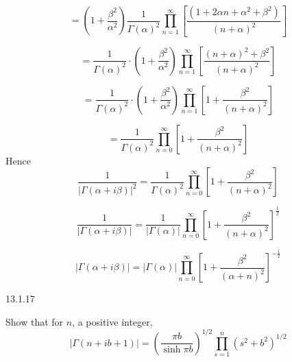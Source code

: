 \documentclass{article}
\begin{document}
\begin{flushleft}
$$
=\left(1+\frac{\beta^{2}}{\alpha^{2}}\right) \frac{1}{\Gamma(\alpha)^{2}} \prod_{n=1}^{\infty}\left[\frac{\left(1+2 \alpha n+\alpha^{2}+\beta^{2}\right)}{(n+\alpha)^{2}}\right]
$$

$$
=\frac{1}{\Gamma(\alpha)^{2}} \cdot\left(1+\frac{\beta^{2}}{\alpha^{2}}\right) \prod_{n=1}^{\infty}\left[\frac{(n+\alpha)^{2}+\beta^{2}}{(n+\alpha)^{2}}\right]
$$

$$
=\frac{1}{\Gamma(\alpha)^{2}} \cdot\left(1+\frac{\beta^{2}}{\alpha^{2}}\right) \prod_{n=1}^{\infty}\left[1+\frac{\beta^{2}}{(n+\alpha)^{2}}\right]
$$

$$
=\frac{1}{\Gamma(\alpha)^{2}} \prod_{n=0}^{\infty}\left[1+\frac{\beta^{2}}{(n+\alpha)^{2}}\right]
$$
Hence
$$
\frac{1}{|\Gamma(\alpha+i \beta)|^{2}}=\frac{1}{\Gamma(\alpha)^{2}} \prod_{n=0}^{\infty}\left[1+\frac{\beta^{2}}{(n+\alpha)^{2}}\right]
$$

$$
\frac{1}{|\Gamma(\alpha+i \beta)|}=\frac{1}{|\Gamma(\alpha)|} \prod_{n=0}^{\infty}\left[1+\frac{\beta^{2}}{(n+\alpha)^{2}}\right]^{\frac{1}{2}}
$$

$$
|\Gamma(\alpha+i \beta)|=|\Gamma(\alpha)| \prod_{n=0}^{\infty}\left[1+\frac{\beta^{2}}{(\alpha+n)^{2}}\right]^{-\frac{1}{2}}
$$



\newpage

\begin{mybox}{13.1.17}

Show that for $n$, a positive integer,
$$
|\Gamma(n+i b+1)|=\left(\frac{\pi b}{\sinh \pi b}\right)^{1 / 2} \prod_{s=1}^{n}\left(s^{2}+b^{2}\right)^{1 / 2}
$$
\end{mybox}


\end{flushleft}
\end{document}
